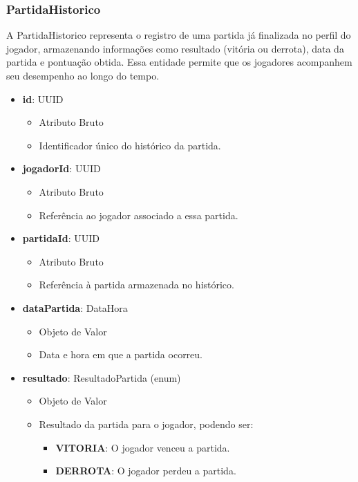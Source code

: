     \subsubsection{PartidaHistorico}
    A PartidaHistorico representa o registro de uma partida já finalizada no perfil do jogador, armazenando informações como resultado (vitória ou derrota), data da partida e pontuação obtida. Essa entidade permite que os jogadores acompanhem seu desempenho ao longo do tempo.
    \begin{itemize}
        \item \textbf{id}: UUID  
              \begin{itemize}
                  \item Atributo Bruto
                  \item Identificador único do histórico da partida.
              \end{itemize}
    
        \item \textbf{jogadorId}: UUID  
              \begin{itemize}
                  \item Atributo Bruto
                  \item Referência ao jogador associado a essa partida.
              \end{itemize}
    
        \item \textbf{partidaId}: UUID  
              \begin{itemize}
                  \item Atributo Bruto
                  \item Referência à partida armazenada no histórico.
              \end{itemize}
    
        \item \textbf{dataPartida}: DataHora  
              \begin{itemize}
                  \item Objeto de Valor
                  \item Data e hora em que a partida ocorreu.
              \end{itemize}
    
        \item \textbf{resultado}: ResultadoPartida (enum)  
              \begin{itemize}
                  \item Objeto de Valor
                  \item Resultado da partida para o jogador, podendo ser:
                  \begin{itemize}
                      \item \textbf{VITORIA}: O jogador venceu a partida.
                      \item \textbf{DERROTA}: O jogador perdeu a partida.
                  \end{itemize}
              \end{itemize}
    

\end{itemize}
